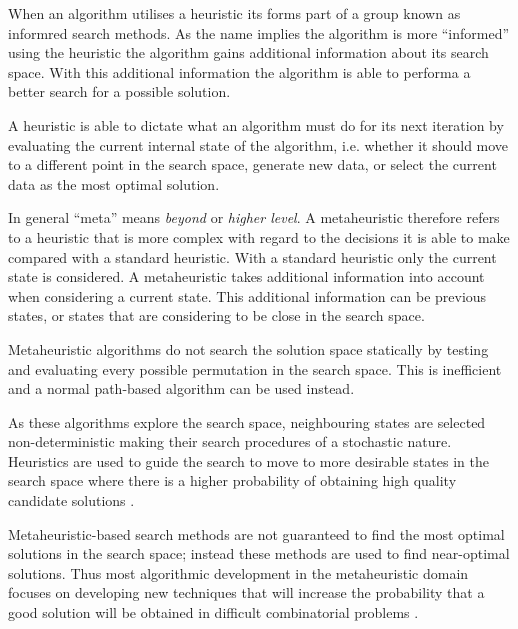 When an algorithm utilises a heuristic its forms part of a group known as informred search methods. As the name implies the algorithm is more ``informed'' using the heuristic the algorithm gains additional information about its search space. With this additional information the algorithm is able to performa a better search for a possible solution\cite{AIModernApproach}.

A heuristic is able to dictate what an algorithm must do for its next iteration by evaluating the current internal state of the algorithm, i.e. whether it should move to a different point in the search space, generate new data, or select the current data as the most optimal solution\cite{AIModernApproach,NatureInspiredMetaHeuristic}.

In general ``meta'' means \emph{beyond} or \emph{higher level}\cite{AIModernApproach,NatureInspiredMetaHeuristic}. A metaheuristic therefore refers to a heuristic that is more complex with regard to the decisions it is able to make compared with a standard heuristic\cite{AIModernApproach,NatureInspiredMetaHeuristic}. With a standard heuristic only the current state is considered\cite{AIModernApproach}. A metaheuristic takes additional information into account when considering a current state\cite{NatureInspiredMetaHeuristic}. This additional information can be previous states, or states that are considering to be close in the search space\cite{AIModernApproach, NatureInspiredMetaHeuristic}.

Metaheuristic algorithms do not search the solution space statically by testing and evaluating every possible permutation in the search space. This is inefficient and a normal path-based algorithm can be used instead\cite{MetaAgricultural}.

As these algorithms explore the search space, neighbouring states are selected non-deterministic making their search procedures of a stochastic nature\cite{HandbookofMH, NatureInspiredMetaHeuristic}. Heuristics are used to guide the search to move to more desirable states in the search space where there is a higher probability of obtaining high quality candidate solutions \cite{TabuMontemanniSmith,SweepMeta}.

Metaheuristic-based search methods are not guaranteed to find the most optimal solutions in the search space; instead these methods are used to find near-optimal solutions. Thus most algorithmic development in the metaheuristic domain focuses on developing new techniques that will increase the probability that a good solution will be obtained in difficult combinatorial problems \cite{MetaAgricultural}.

